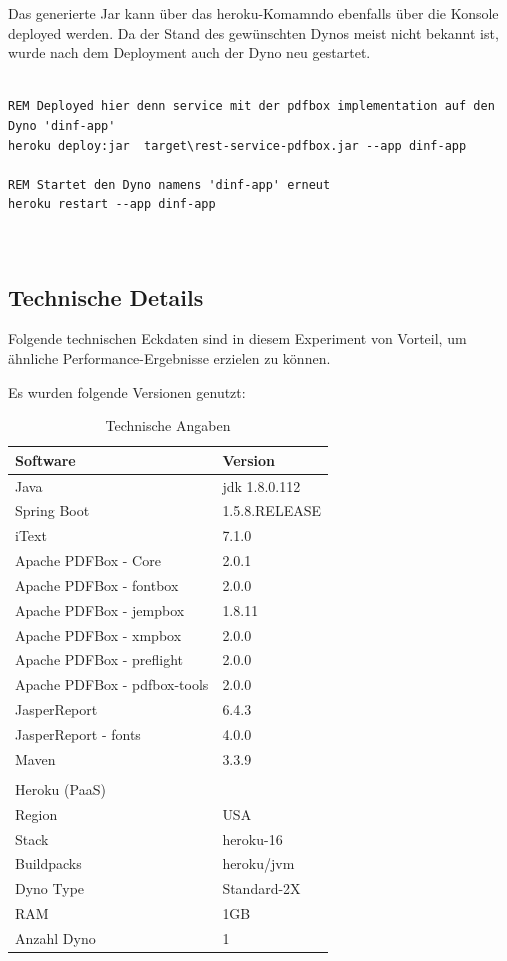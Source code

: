 \documentclass[main.tex]{subfiles}
\begin{document}
Das generierte Jar kann über das heroku-Komamndo ebenfalls über die Konsole deployed werden. Da der Stand des gewünschten Dynos meist nicht bekannt ist, wurde nach dem Deployment auch der Dyno neu gestartet. 

\begin{lstlisting}[language=command.com]

REM Deployed hier denn service mit der pdfbox implementation auf den Dyno 'dinf-app'
heroku deploy:jar  target\rest-service-pdfbox.jar --app dinf-app

REM Startet den Dyno namens 'dinf-app' erneut
heroku restart --app dinf-app



\end{lstlisting}

\subsection{Technische Details}

Folgende technischen Eckdaten sind in diesem Experiment von Vorteil, um ähnliche Performance-Ergebnisse erzielen zu können. 

Es wurden folgende Versionen genutzt: 


\begin{table}[!hb]
\label{softversion}
\begin{tabular}{ll}
Software          & Version   \\ \hline
Java        &      jdk 1.8.0.112      \\
Spring Boot &         1.5.8.RELEASE        \\

iText        &        7.1.0  \\
Apache PDFBox - Core &  2.0.1 \\
Apache PDFBox - fontbox & 2.0.0 \\
Apache PDFBox - jempbox & 1.8.11 \\
Apache PDFBox - xmpbox & 2.0.0 \\
Apache PDFBox - preflight & 2.0.0 \\
Apache PDFBox - pdfbox-tools & 2.0.0 \\
JasperReport & 6.4.3 \\
JasperReport - fonts & 4.0.0 \\
Maven   &  3.3.9 \\
 & \\

Heroku (PaaS)    & \\ \hline
Region & USA \\
Stack & heroku-16 \\
Buildpacks & heroku/jvm \\
Dyno Type & Standard-2X \\
RAM & 1GB \\
Anzahl Dyno & 1 \\


\end{tabular}
\caption{Technische Angaben}
\end{table}
\end{document}
